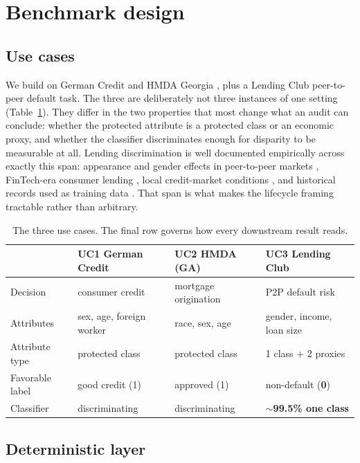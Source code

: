 \documentclass[10pt,letterpaper]{article}
\begin{document}
\section{Benchmark design}

\subsection{Use cases}

We build on German Credit \citep{germancredit} and HMDA Georgia
\citep{hmda}, plus a Lending Club peer-to-peer default task. The three are
deliberately not three instances of one setting (Table~\ref{tab:usecases}).
They differ in the two properties that most change what an audit can conclude:
whether the protected attribute is a protected class or an economic proxy, and
whether the classifier discriminates enough for disparity to be measurable at
all. Lending discrimination is well documented empirically across exactly this
span: appearance and gender effects in peer-to-peer markets
\citep{duarte2012,pope2011}, FinTech-era consumer lending
\citep{bartlett2019}, local credit-market conditions \citep{butler2017}, and
historical records used as training data \citep{sarwal2024}. That span is what
makes the lifecycle framing tractable rather than arbitrary.

\begin{table}[t]
\centering\small
\caption{The three use cases. The final row governs how every downstream result
reads.}
\label{tab:usecases}
\begin{tabular}{llll}
\toprule
& \textbf{UC1 German Credit} & \textbf{UC2 HMDA (GA)} & \textbf{UC3 Lending Club}\\
\midrule
Decision & consumer credit & mortgage origination & P2P default risk\\
Attributes & sex, age, foreign worker & race, sex, age & gender, income, loan size\\
Attribute type & protected class & protected class & 1 class + 2 proxies\\
Favorable label & good credit (1) & approved (1) & non-default (\textbf{0})\\
Classifier & discriminating & discriminating & \textbf{$\sim$99.5\% one class}\\
\bottomrule
\end{tabular}
\end{table}

\subsection{Deterministic layer}
\end{document}

